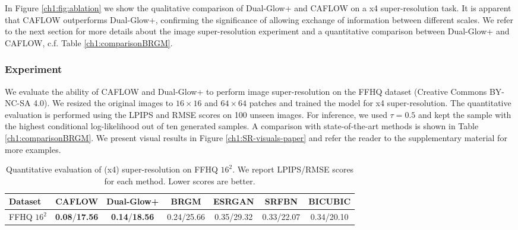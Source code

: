 In Figure \ref{ch1:fig:ablation} we show the qualitative comparison of Dual-Glow+ and CAFLOW on a x4 super-resolution task.  It is apparent that CAFLOW outperforms Dual-Glow+, confirming the significance of allowing exchange of information between different scales. We refer to the next section for more details about the image super-resolution experiment and a quantitative comparison between Dual-Glow+ and CAFLOW, c.f. Table \ref{ch1:comparisonBRGM}.

\subsubsection{Experiment}
We evaluate the ability of CAFLOW and Dual-Glow+ to perform image super-resolution on the FFHQ dataset \cite{karras2019style} (Creative Commons BY-NC-SA 4.0). We resized the original images to $16\times16$ and $64\times 64$ patches and trained the model for x4 super-resolution. The quantitative evaluation is performed using the LPIPS and RMSE scores on 100 unseen images. For inference, we used $\tau=0.5$ and kept the sample with the highest conditional log-likelihood out of ten generated samples. A comparison with state-of-the-art methods is shown in Table \ref{ch1:comparisonBRGM}. We present visual results in Figure \ref{ch1:SR-visuals-paper} and refer the reader to the supplementary material for more examples.

{\footnotesize
\begin{table}[h!]
\centering
\caption{Quantitative evaluation of (x4) super-resolution on FFHQ $16^2$. We report LPIPS/RMSE scores for each method. Lower scores are better.}\label{ch1:comparisonBRGM}
\label{ch1:eval-super-resolution}
\setlength{\tabcolsep}{3pt}


\begin{tabular}{l|cccccc}\label{ch1:tab:one}
 Dataset &    \textbf{CAFLOW} & \textbf{Dual-Glow+} &   BRGM \cite{BRGM}     &   ESRGAN \cite{ESRGAN}    &   SRFBN \cite{li2019feedback}  &  BICUBIC \\

\midrule
   FFHQ $16^2$ &  \textbf{0.08}/\textbf{17.56}  &  \textbf{0.14}/\textbf{18.56} & 0.24/25.66  &  0.35/29.32 &  0.33/22.07 & 0.34/20.10 \\

\end{tabular}
\end{table}
}

